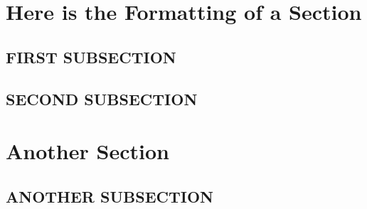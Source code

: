 \lipsum[2-4]

\pagebreak
\begin{callout}[title=A CALLOUT SPANS THE PAGE]
\lipsum[3]
\end{callout}

\section{Here is the Formatting of a Section}

\lipsum[2]

\subsection{FIRST SUBSECTION}

\lipsum[1]

\subsection{SECOND SUBSECTION}

\lipsum[1]

\section{Another Section}

\lipsum[1]

\subsection{ANOTHER SUBSECTION}

\lipsum[1]

